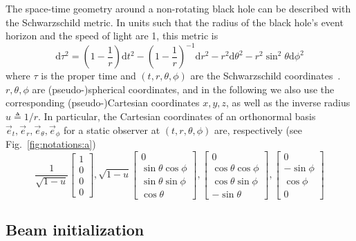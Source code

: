\documentclass{document}
\newcommand{\diff}{\mathrm d}
\begin{document}
The space-time geometry around a non-rotating black hole can be described with 
the Schwarzschild metric. In units such that the radius of the black hole's 
event horizon and the speed of light are 1, this metric is
\begin{equation}
\diff\tau^2 = \left(1 - \frac{1}{r}\right) \diff t^2 -
              \left(1 - \frac{1}{r}\right)^{-1} \diff r^2 -
              r^2 \diff \theta^2 - 
              r^2 \sin^2\theta \diff \phi^2
\label{eq:metric}
\end{equation}
where $\tau$ is the proper time and $(t, r, \theta, \phi)$ are the 
Schwarzschild coordinates~\cite{weinberg1972}. $r, \theta, \phi$ are 
(pseudo-)spherical coordinates, and in the following we also use the 
corresponding (pseudo-)Cartesian coordinates $x,y,z$, as well as the inverse 
radius $u\triangleq 1/r$. In particular, the Cartesian coordinates of an 
orthonormal basis $\vec{e}_t, \vec{e}_r, \vec{e}_\theta, \vec{e}_\phi$ for 
a static observer at $(t, r, \theta, \phi)$ are, respectively (see 
Fig.~\ref{fig:notations:a})
\begin{equation}
\frac{1}{\sqrt{1-u}}
\begin{bmatrix}
  1\\
  0\\
  0\\
  0
\end{bmatrix},
%
\sqrt{1-u}
\begin{bmatrix}
  0\\
  \sin\theta \cos\phi\\
  \sin\theta \sin\phi\\
  \cos\theta
\end{bmatrix},
%
\begin{bmatrix}
  0\\
  \cos\theta \cos\phi\\
  \cos\theta \sin\phi\\
  -\sin\theta
\end{bmatrix},
%
\begin{bmatrix}
  0\\
  -\sin\phi\\
  \cos\phi\\
  0
\end{bmatrix}
\label{eq:staticbasis}
\end{equation}

\subsection{Beam initialization}
\end{document}
